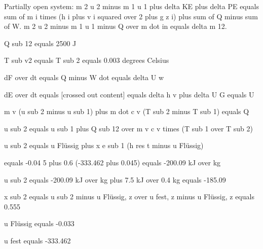 Partially open system:
m 2 u 2 minus m 1 u 1 plus delta KE plus delta PE equals sum of m i times (h i plus v i squared over 2 plus g z i) plus sum of Q minus sum of W.
m 2 u 2 minus m 1 u 1 minus Q over m dot in equals delta m 12.

Q sub 12 equals 2500 J

T sub v2 equals T sub 2 equals 0.003 degrees Celsius

dF over dt equals Q minus W dot equals delta U w

dE over dt equals [crossed out content] equals delta h v plus delta U G equals U

m v (u sub 2 minus u sub 1) plus m dot c v (T sub 2 minus T sub 1) equals Q

u sub 2 equals u sub 1 plus Q sub 12 over m v c v times (T sub 1 over T sub 2)

u sub 2 equals u Flüssig plus x e sub 1 (h res t minus u Flüssig)

equals -0.04 5 plus 0.6 (-333.462 plus 0.045) equals -200.09 kJ over kg

u sub 2 equals -200.09 kJ over kg plus 7.5 kJ over 0.4 kg equals -185.09

x sub 2 equals u sub 2 minus u Flüssig, z over u fest, z minus u Flüssig, z equals 0.555

u Flüssig equals -0.033

u fest equals -333.462